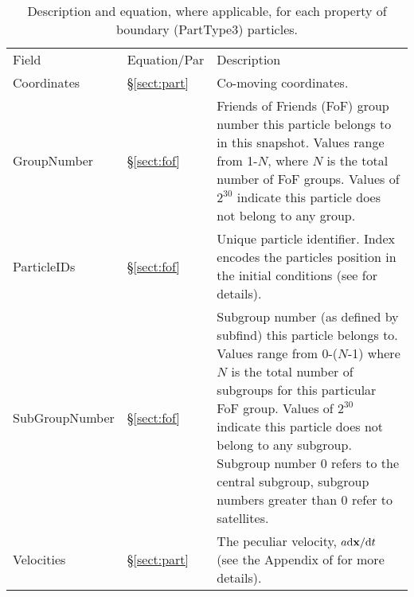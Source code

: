 \documentclass[10pt, a4paper]{article}
\newcommand{\groupnumber}{Friends of Friends (FoF) group number this particle
belongs to in this snapshot. Values range from 1-$N$, where $N$ is the total
number of FoF groups. Values of $2^{30}$ indicate this particle does not belong
to any group.}
\newcommand{\subgroupnumber}{Subgroup number (as defined by {\sc subfind}) this
particle belongs to. Values range from 0-($N$-1) where $N$ is the total number
of subgroups for this particular FoF group. Values of $2^{30}$ indicate this
particle does not belong to any subgroup. Subgroup number 0 refers to the
central subgroup, subgroup numbers greater than 0 refer to satellites.}
\newcommand{\velocity}{The peculiar velocity, $a{\rm d}{\bf x}/{\rm d}t$ (see
the Appendix of \cite{mcalpine2016} for more details).}
\newcommand{\coordinates}{Co-moving coordinates.}
\begin{document}
\begin{table}
\label{table:boundary3}
\caption{Description and equation, where applicable, for each property of boundary
(PartType3) particles.}
\begin{center}
\footnotesize
\renewcommand{\arraystretch}{1.5}
\begin{tabular}{>{\ttfamily}p{4cm}p{1.5cm}p{11cm}}
\multicolumn{3}{l}{\large \bf PartType3: Boundary Particles} \\
\hline
Field & Equation/Par & Description \\ \hline\hline

Coordinates &
\S\ref{sect:part} &
\coordinates \\

GroupNumber &
\S\ref{sect:fof} &
\groupnumber \\

ParticleIDs &
\S\ref{sect:fof} & Unique particle identifier. Index encodes the particles position in the
initial conditions (see \cite{schaye2015} for details). \\

SubGroupNumber &
\S\ref{sect:fof} &
\subgroupnumber \\

Velocities &
\S\ref{sect:part} & \velocity \\

\hline
\end{tabular}
\end{center}
\end{table}
\end{document}
